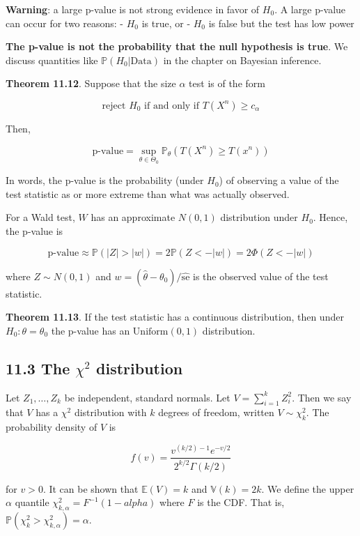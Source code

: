 \textbf{Warning}: a large p-value is not strong evidence in favor of
\(H_0\). A large p-value can occur for two reasons: - \(H_0\) is true,
or - \(H_0\) is false but the test has low power

\textbf{The p-value is not the probability that the null hypothesis is
true}. We discuss quantities like \(\mathbb{P}(H_0 | \text{Data})\) in
the chapter on Bayesian inference.

\textbf{Theorem 11.12}. Suppose that the size \(\alpha\) test is of the
form

\[ \text{reject } H_0 \text{ if and only if } T(X^n) \geq c_\alpha\]

Then,

\[ \text{p-value} = \sup_{\theta \in \Theta_0} \mathbb{P}_\theta \left(T(X^n) \geq T(x^n) \right)\]

In words, the p-value is the probability (under \(H_0\)) of observing a
value of the test statistic as or more extreme than what was actually
observed.

For a Wald test, \(W\) has an approximate \(N(0, 1)\) distribution under
\(H_0\). Hence, the p-value is

\[ \text{p-value} \approx \mathbb{P}(|Z| > |w|) = 2\mathbb{P}(Z < -|w|) = 2 \Phi(Z < -|w|) \]

where \(Z \sim N(0, 1)\) and
\(w = (\hat{\theta} - \theta_0) / \hat{\text{se}}\) is the observed
value of the test statistic.

\textbf{Theorem 11.13}. If the test statistic has a continuous
distribution, then under \(H_0: \theta = \theta_0\) the p-value has an
\(\text{Uniform}(0, 1)\) distribution.

\subsection{\texorpdfstring{11.3 The \(\chi^2\)
distribution}{11.3 The \textbackslash chi\^{}2 distribution}}\label{the-chi2-distribution}

Let \(Z_1, \dots, Z_k\) be independent, standard normals. Let
\(V = \sum_{i=1}^k Z_i^2\). Then we say that \(V\) has a \(\chi^2\)
distribution with \(k\) degrees of freedom, written \(V \sim \chi^2_k\).
The probability density of \(V\) is

\[ f(v) = \frac{v^{(k/2) - 1}e^{-v/2}}{2^{k/2} \Gamma(k / 2)} \]

for \(v > 0\). It can be shown that \(\mathbb{E}(V) = k\) and
\(\mathbb{V}(k) = 2k\). We define the upper \(\alpha\) quantile
\(\chi^2_{k, \alpha} = F^{-1}(1 - alpha)\) where \(F\) is the CDF. That
is, \(\mathbb{P}(\chi^2_k > \chi^2_{k, \alpha}) = \alpha\).

